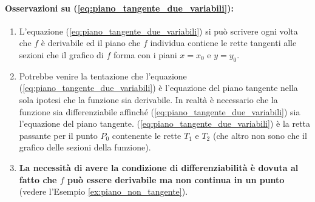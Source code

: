 \paragraph{Osservazioni su (\ref{eq:piano_tangente_due_variabili}):} 
\begin{enumerate}
	\item L'equazione (\ref{eq:piano_tangente_due_variabili}) si può scrivere ogni volta che $f$ è derivabile ed il piano che $f$ individua contiene le rette tangenti alle sezioni che il grafico di $f$ forma con i piani $x=x_0$ e $y=y_0$.
	\item Potrebbe venire la tentazione che l'equazione (\ref{eq:piano_tangente_due_variabili}) è l'equazione del piano tangente nella sola ipotesi che la funzione sia derivabile. In realtà è necessario che la funzione sia differenziabile affinché (\ref{eq:piano_tangente_due_variabili}) sia l'equazione del piano tangente.
	(\ref{eq:piano_tangente_due_variabili}) è la retta passante per il punto $P_0$ contenente le rette $T_1$ e $T_2$ (che altro non sono che il grafico delle sezioni della funzione).
	\item \textbf{La necessità di avere la condizione di differenziabilità è dovuta al fatto che $f$ può essere derivabile ma non continua in un punto} (vedere l'Esempio \ref{ex:piano_non_tangente}).
\end{enumerate}

